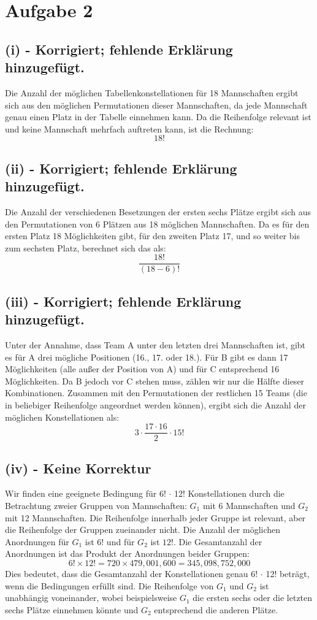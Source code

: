 \documentclass{article}
\begin{document}
\newpage

\section*{Aufgabe 2}

\subsection*{(i) - Korrigiert; fehlende Erklärung hinzugefügt.}
Die Anzahl der möglichen Tabellenkonstellationen für 18 Mannschaften ergibt sich aus den möglichen Permutationen dieser Mannschaften, da jede Mannschaft genau einen Platz in der Tabelle einnehmen kann. Da die Reihenfolge relevant ist und keine Mannschaft mehrfach auftreten kann, ist die Rechnung:
\[ 18! \]

\subsection*{(ii) - Korrigiert; fehlende Erklärung hinzugefügt.}
Die Anzahl der verschiedenen Besetzungen der ersten sechs Plätze ergibt sich aus den Permutationen von 6 Plätzen aus 18 möglichen Mannschaften. Da es für den ersten Platz 18 Möglichkeiten gibt, für den zweiten Platz 17, und so weiter bis zum sechsten Platz, berechnet sich das als:
\[ \frac{18!}{(18-6)!} \]

\subsection*{(iii) - Korrigiert; fehlende Erklärung hinzugefügt.}
Unter der Annahme, dass Team A unter den letzten drei Mannschaften ist, gibt es für A drei mögliche Positionen (16., 17. oder 18.). Für B gibt es dann 17 Möglichkeiten (alle außer der Position von A) und für C entsprechend 16 Möglichkeiten. Da B jedoch vor C stehen muss, zählen wir nur die Hälfte dieser Kombinationen. Zusammen mit den Permutationen der restlichen 15 Teams (die in beliebiger Reihenfolge angeordnet werden können), ergibt sich die Anzahl der möglichen Konstellationen als:
\[ 3 \cdot \frac{17 \cdot 16}{2} \cdot 15! \]

\subsection*{(iv) - Keine Korrektur}
Wir finden eine geeignete Bedingung für 6! \(\cdot\) 12! Konstellationen durch die Betrachtung zweier Gruppen von Mannschaften: \( G_1 \) mit 6 Mannschaften und \( G_2 \) mit 12 Mannschaften. Die Reihenfolge innerhalb jeder Gruppe ist relevant, aber die Reihenfolge der Gruppen zueinander nicht. Die Anzahl der möglichen Anordnungen für \( G_1 \) ist \( 6! \) und für \( G_2 \) ist \( 12! \). Die Gesamtanzahl der Anordnungen ist das Produkt der Anordnungen beider Gruppen:
\[ 6! \times 12! = 720 \times 479,001,600 = 345,098,752,000 \]
Dies bedeutet, dass die Gesamtanzahl der Konstellationen genau 6! \(\cdot\) 12! beträgt, wenn die Bedingungen erfüllt sind. Die Reihenfolge von \( G_1 \) und \( G_2 \) ist unabhängig voneinander, wobei beispielsweise \( G_1 \) die ersten sechs oder die letzten sechs Plätze einnehmen könnte und \( G_2 \) entsprechend die anderen Plätze.
\end{document}
